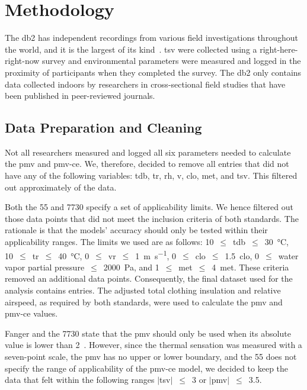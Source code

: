\section{Methodology}\label{sec:methodology}
The \ac{db2} has  independent recordings from various field investigations throughout the world, and it is the largest of its kind~\cite{FoldvaryLicina2018, db2dryad}.
\Ac{tsv} were collected using a right-here-right-now survey and environmental parameters were measured and logged in the proximity of participants when they completed the survey.
The \ac{db2} only contains data collected indoors by researchers in cross-sectional field studies that have been published in peer-reviewed journals.

\subsection{Data Preparation and Cleaning}\label{subsec:data-processing-and-cleaning}
Not all researchers measured and logged all six parameters needed to calculate the \ac{pmv} and \ac{pmv-ce}.
We, therefore, decided to remove all entries that did not have any of the following variables: \ac{tdb}, \ac{tr}, \ac{rh}, \ac{v}, \ac{clo}, \ac{met}, and \ac{tsv}.
This filtered out approximately  of the data.

Both the \gls{55} and \gls{7730} specify a set of applicability limits.
We hence filtered out those data points that did not meet the inclusion criteria of both standards.
The rationale is that the models' accuracy should only be tested within their applicability ranges.
The limits we used are as follows:
\num{10}~$\leq$~\ac{tdb}~$\leq$~\qty{30}{\celsius},
\num{10}~$\leq$~\ac{tr}~$\leq$~\qty{40}{\celsius},
\num{0}~$\leq$~\ac{vr}~$\leq$~\qty{1}{\m\per\s},
\num{0}~$\leq$~\ac{clo}~$\leq$~\qty{1.5}{clo},
\num{0}~$\leq$~water vapor partial pressure~$\leq$~\qty{2000}{\pascal},
and \num{1}~$\leq$~\ac{met}~$\leq$~\qty{4}{met}.
These criteria removed an additional  data points.
Consequently, the final dataset used for the analysis contains  entries.
The adjusted total clothing insulation and relative airspeed, as required by both standards, were used to calculate the \ac{pmv} and \ac{pmv-ce} values.

Fanger and the \gls{7730} state that the \ac{pmv} should only be used when its absolute value is lower than 2~\cite{Fanger1970, iso7730}.
However, since the thermal sensation was measured with a seven-point scale, the \ac{pmv} has no upper or lower boundary, and the \gls{55} does not specify the range of applicability of the \ac{pmv-ce} model, we decided to keep the data that felt within the following ranges $|$\ac{tsv}$|$~$\leq$~\num{3} or $|$\ac{pmv}$|$~$\leq$~\num{3.5}.

